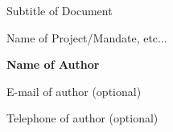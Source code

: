 \begin{titlepage}
\vspace{0.5cm}

\hspace*{2cm}
{\huge {\textcolor{swisstphred}{Subtitle of Document}} \par} %

\hspace*{2cm}
{\huge {\textcolor{swisstphred}{Name of Project/Mandate, etc...}} \par} %

\vspace{0.5cm}

\hspace*{2cm}
{\large \textbf{Name of Author}} %

\hspace*{2cm}
{\large E-mail of author (optional)} %

\hspace*{2cm}
{\large Telephone of author (optional)} %


\end{titlepage}
